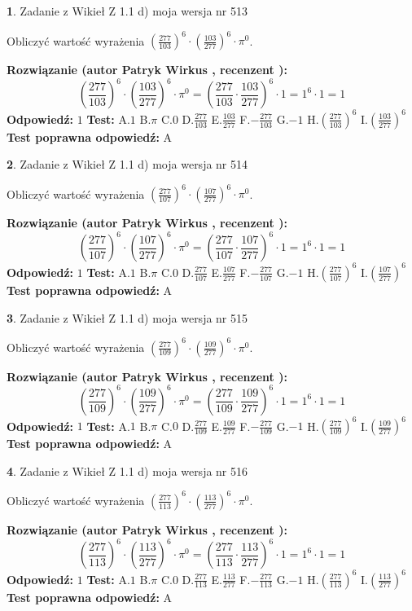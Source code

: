 \documentclass[12pt, a4paper]{article}
\theoremstyle{definition} %
\newtheorem{zad}{}
\newcommand{\zadStart}[1]{\begin{zad}#1\newline}
\newcommand{\zadStop}{\end{zad}}
\newcommand{\rozwStart}[2]{\noindent \textbf{Rozwiązanie (autor #1 , recenzent #2): }\newline}
\newcommand{\rozwStop}{\newline}
\newcommand{\odpStart}{\noindent \textbf{Odpowiedź:}\newline}
\newcommand{\odpStop}{\newline}
\newcommand{\testStart}{\noindent \textbf{Test:}\newline}
\newcommand{\testStop}{\newline}
\newcommand{\kluczStart}{\noindent \textbf{Test poprawna odpowiedź:}\newline}
\newcommand{\kluczStop}{\newline}
\begin{document}
\zadStart{Zadanie z Wikieł Z 1.1 d) moja wersja nr 513}

Obliczyć wartość wyrażenia $(\frac{277}{103})^{6} \cdot (\frac{103}{277})^{6} \cdot \pi^{0}$.
\zadStop
\rozwStart{Patryk Wirkus}{}
$$(\frac{277}{103})^{6} \cdot (\frac{103}{277})^{6} \cdot \pi^{0} = (\frac{277}{103} \cdot \frac{103}{277})^{6} \cdot 1 = 1^{6} \cdot 1 = 1$$
\rozwStop
\odpStart
$1$
\odpStop
\testStart
A.$1$ B.$\pi$ C.$0$ D.$\frac{277}{103}$ E.$\frac{103}{277}$
F.$-\frac{277}{103}$ G.$-1$
H.$(\frac{277}{103})^{6}$
I.$(\frac{103}{277})^{6}$
\testStop
\kluczStart
A
\kluczStop



\zadStart{Zadanie z Wikieł Z 1.1 d) moja wersja nr 514}

Obliczyć wartość wyrażenia $(\frac{277}{107})^{6} \cdot (\frac{107}{277})^{6} \cdot \pi^{0}$.
\zadStop
\rozwStart{Patryk Wirkus}{}
$$(\frac{277}{107})^{6} \cdot (\frac{107}{277})^{6} \cdot \pi^{0} = (\frac{277}{107} \cdot \frac{107}{277})^{6} \cdot 1 = 1^{6} \cdot 1 = 1$$
\rozwStop
\odpStart
$1$
\odpStop
\testStart
A.$1$ B.$\pi$ C.$0$ D.$\frac{277}{107}$ E.$\frac{107}{277}$
F.$-\frac{277}{107}$ G.$-1$
H.$(\frac{277}{107})^{6}$
I.$(\frac{107}{277})^{6}$
\testStop
\kluczStart
A
\kluczStop



\zadStart{Zadanie z Wikieł Z 1.1 d) moja wersja nr 515}

Obliczyć wartość wyrażenia $(\frac{277}{109})^{6} \cdot (\frac{109}{277})^{6} \cdot \pi^{0}$.
\zadStop
\rozwStart{Patryk Wirkus}{}
$$(\frac{277}{109})^{6} \cdot (\frac{109}{277})^{6} \cdot \pi^{0} = (\frac{277}{109} \cdot \frac{109}{277})^{6} \cdot 1 = 1^{6} \cdot 1 = 1$$
\rozwStop
\odpStart
$1$
\odpStop
\testStart
A.$1$ B.$\pi$ C.$0$ D.$\frac{277}{109}$ E.$\frac{109}{277}$
F.$-\frac{277}{109}$ G.$-1$
H.$(\frac{277}{109})^{6}$
I.$(\frac{109}{277})^{6}$
\testStop
\kluczStart
A
\kluczStop



\zadStart{Zadanie z Wikieł Z 1.1 d) moja wersja nr 516}

Obliczyć wartość wyrażenia $(\frac{277}{113})^{6} \cdot (\frac{113}{277})^{6} \cdot \pi^{0}$.
\zadStop
\rozwStart{Patryk Wirkus}{}
$$(\frac{277}{113})^{6} \cdot (\frac{113}{277})^{6} \cdot \pi^{0} = (\frac{277}{113} \cdot \frac{113}{277})^{6} \cdot 1 = 1^{6} \cdot 1 = 1$$
\rozwStop
\odpStart
$1$
\odpStop
\testStart
A.$1$ B.$\pi$ C.$0$ D.$\frac{277}{113}$ E.$\frac{113}{277}$
F.$-\frac{277}{113}$ G.$-1$
H.$(\frac{277}{113})^{6}$
I.$(\frac{113}{277})^{6}$
\testStop
\kluczStart
A
\kluczStop
\end{document}
